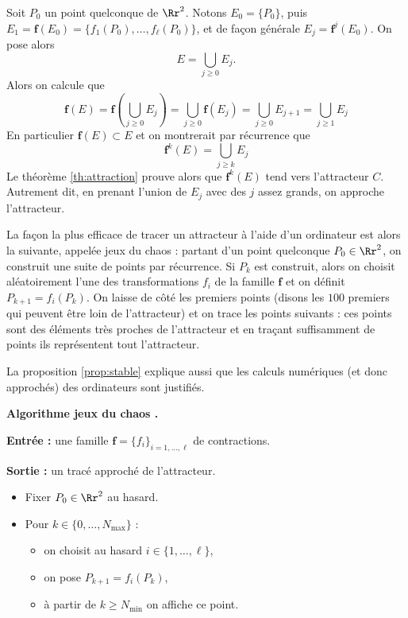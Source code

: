 \documentclass[11pt,class=report,crop=false]{standalone}
\begin{document}
Soit $P_0$ un point quelconque de $\Rr^2$. Notons
$E_0 = \{ P_0 \}$, puis $E_1 = \mathbf{f}(E_0) = \{f_1(P_0),\ldots,f_\ell(P_0)\}$,
et de façon générale $E_j = \mathbf{f}^j(E_0)$. On pose alors
$$E = \bigcup_{j \ge 0} E_j.$$
Alors on calcule que 
$$\mathbf{f}(E) 
= \mathbf{f}\left( \bigcup_{j \ge 0} E_j \right)
= \bigcup_{j \ge 0} \mathbf{f}(E_j) 
= \bigcup_{j \ge 0} E_{j+1}
= \bigcup_{j \ge 1} E_{j}$$
En particulier $\mathbf{f}(E) \subset E$ et on montrerait par récurrence que
$$\mathbf{f}^k(E)=  \bigcup_{j \ge k} E_{j}$$
Le théorème \ref{th:attraction} prouve alors que 
$\mathbf{f}^k(E)$ tend vers l'attracteur $C$. Autrement dit, en prenant l'union de $E_j$ avec 
des $j$ assez grands, on approche l'attracteur.

\bigskip

La façon la plus efficace de tracer un attracteur à l'aide d'un ordinateur est alors la suivante, 
appelée \og jeux du chaos \fg{} :
partant d'un point quelconque $P_0 \in \Rr^2$, on construit une suite de points par récurrence.
Si $P_k$ est construit, alors on choisit aléatoirement l'une des transformations
$f_i$ de la famille $\mathbf{f}$ et on définit $P_{k+1}=f_i(P_k)$. 
On laisse de côté les premiers points (disons les $100$ premiers qui peuvent être \og loin \fg{} de l'attracteur) et on trace les points suivants : ces points sont des éléments très proches de l'attracteur
et en traçant suffisamment de points ils représentent tout l'attracteur.

La proposition \ref{prop:stable} explique aussi que les calculs numériques (et donc approchés) 
des ordinateurs sont justifiés. 

\bigskip


\textbf{Algorithme \og jeux du chaos \fg{}.}

\textbf{Entrée :} une famille $\mathbf{f} = \{ f_i\}_{i=1,\ldots,\ell}$ de contractions.

\textbf{Sortie :} un tracé approché de l'attracteur.

\begin{itemize}
  \item Fixer $P_0 \in \Rr^2$ au hasard.
    
  \item Pour $k \in \{0,\ldots,N_{\max}\}$ :
  \begin{itemize}
      \item on choisit au hasard $i \in \{1,\ldots,\ell\}$,
      \item on pose $P_{k+1} = f_i(P_k)$,
      \item à partir de $k \ge N_{\min}$ on affiche ce point.
  \end{itemize}
\end{itemize}
\end{document}
